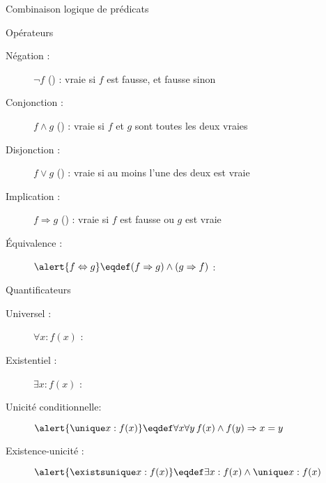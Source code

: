 
\begingroup

\begin{frame}{Combinaison logique de prédicats}
  \begin{block}{Opérateurs}
    \begin{description}
    \item[Négation : ] \alert{$\lnot f$} () : vraie si $f$ est fausse, et fausse sinon
    \item[Conjonction : ] \alert{$f \land g$} () : vraie si $f$ et $g$ sont toutes les deux vraies
    \item[Disjonction : ] \alert{$f \lor g$} () : vraie si au moins l'une des deux est vraie 
    \item[Implication : ] \alert{$f \Rightarrow g$} () : vraie si $f$ est fausse ou $g$ est vraie 
    \item[Équivalence : ] $\alert{f \Leftrightarrow g} \eqdef (f \Rightarrow g) \land (g \Rightarrow f)$ : 
    \end{description}
  \end{block}
  \begin{block}{Quantificateurs}
    \begin{description}
    \item[Universel : ] \alert{$\forall x : f(x)$} : 
    \item[Existentiel : ] \alert{$\exists x : f(x)$} : 
    \item[Unicité conditionnelle: ] $\alert{\unique x : f(x)} \eqdef \forall x \forall y\, f(x) \land f(y) \Rightarrow x=y$\\
    \item[Existence-unicité : ] $\alert{\existsunique x : f(x)} \eqdef \exists x : f(x) \land \unique x : f(x)$\\
    \end{description}
  \end{block}
\end{frame}


\endgroup
